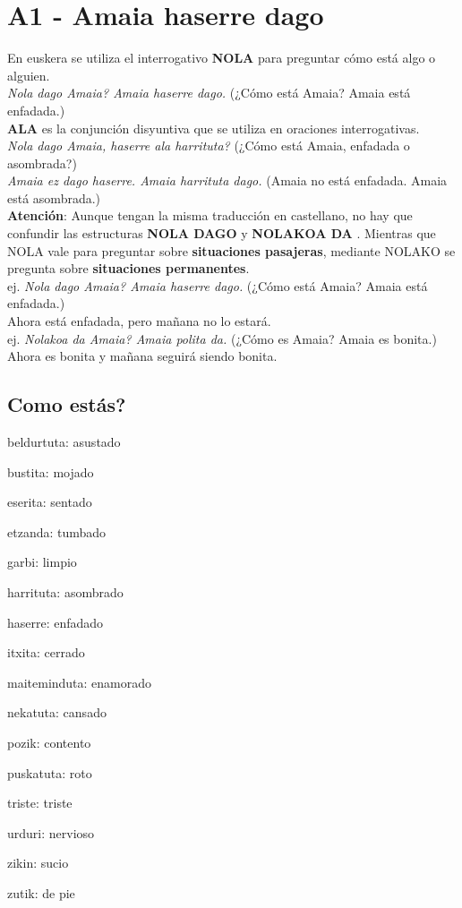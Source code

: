 \documentclass[11pt, a4paper]{article}
\begin{document}
\section{A1 - Amaia haserre dago}
\noindent En euskera se utiliza el interrogativo \textbf{NOLA} para preguntar cómo está algo o alguien.\\
\indent \textit{Nola dago Amaia? Amaia haserre dago.} (¿Cómo está Amaia? Amaia está enfadada.)\\

\noindent \textbf{ALA} es la conjunción disyuntiva que se utiliza en oraciones interrogativas.\\
\indent \textit{Nola dago Amaia, haserre ala harrituta?} (¿Cómo está Amaia, enfadada o asombrada?)\\
\indent \textit{Amaia ez dago haserre. Amaia harrituta dago.}
(Amaia no está enfadada. Amaia está asombrada.)\\

\noindent \textbf{Atención}: Aunque tengan la misma traducción en castellano, no hay que confundir las estructuras \textbf{NOLA DAGO} y \textbf{NOLAKOA DA} . Mientras que NOLA vale para preguntar sobre \textbf{situaciones pasajeras}, mediante NOLAKO se pregunta sobre \textbf{situaciones permanentes}.\\
\indent ej. \textit{Nola dago Amaia? Amaia haserre dago.} (¿Cómo está Amaia? Amaia está enfadada.)\\ \indent Ahora está enfadada, pero mañana no lo estará.\\
\indent ej. \textit{Nolakoa da Amaia? Amaia polita da.} (¿Cómo es Amaia? Amaia es bonita.)\\ \indent Ahora es bonita y mañana seguirá siendo bonita.

\subsection{Como est\'as?}
\begin{itemize}
\begin{multicols}{2}
\item beldurtuta: asustado
\item bustita: mojado
\item eserita: sentado
\item etzanda: tumbado
\item garbi: limpio
\item harrituta: asombrado
\item haserre: enfadado
\item itxita: cerrado
\item maiteminduta: enamorado
\item nekatuta: cansado
\item pozik: contento
\item puskatuta: roto
\item triste: triste
\item urduri: nervioso
\item zikin: sucio
\item zutik: de pie
\end{multicols}
\end{itemize}
\end{document}
